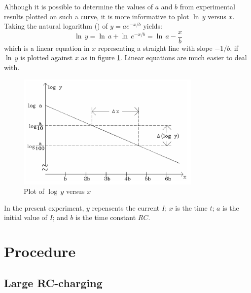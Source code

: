 Although it is possible to determine the values of $a$ and $b$ from experimental results plotted on such a curve, it is more informative to plot $\ln\,y$ versus $x$. Taking the natural logarithm (\ln) of $y=ae^{-x/b}$ yields:
\begin{equation}
    \ln\,y = \ln\,a + \ln\,e^{-x/b} = \ln\,a - \frac{x}{b}
    \label{eqn:logslope}
\end{equation}
which is a linear equation in $x$ representing a straight line with slope $-1/b$, if $\ln\,y$ is plotted against $x$ as in figure \ref{fig:logplot}. Linear equations are much easier to deal with. \myskip

\begin{figure}[h]
    \begin{center}
        \includegraphics[width=0.8\textwidth]{./Exp4/pic/image5.png}
    \end{center}
    \caption{Plot of $\log\,y$ versus $x$}
    \label{fig:logplot}
\end{figure}

In the present experiment, $y$ repensents the current $I$; $x$ is the time $t$; $a$ is the initial value of $I$; and $b$ is the time constant $RC$. \myskip

\section{Procedure}

\subsection{Large RC-charging}

